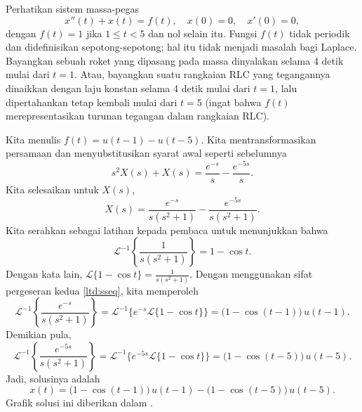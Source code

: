 \begin{example} \label{lt:rocketex}
Perhatikan
sistem massa-pegas
\begin{equation*}
x''(t) + x(t) = f(t) , \quad x(0) = 0, \quad x'(0) = 0,
\end{equation*}
dengan $f(t) = 1$ jika $1 \leq t < 5$ dan nol selain itu.
Fungsi $f(t)$ tidak periodik dan didefinisikan sepotong-sepotong; hal itu tidak menjadi masalah bagi Laplace.
Bayangkan sebuah
roket yang dipasang pada massa dinyalakan selama 4 detik mulai dari
$t=1$.  Atau, bayangkan suatu rangkaian RLC yang tegangannya dinaikkan
dengan laju konstan selama 4 detik mulai dari $t=1$, lalu dipertahankan tetap 
kembali
mulai dari $t=5$ (ingat bahwa $f(t)$ merepresentasikan turunan
tegangan dalam rangkaian RLC).

\pagebreak[2]
Kita menulis $f(t) = u(t-1) - u(t-5)$.  Kita mentransformasikan persamaan dan menyubstitusikan
syarat awal seperti sebelumnya
\begin{equation*}
s^2 X(s) + X(s) = \frac{e^{-s}}{s} - \frac{e^{-5s}}{s} .
\end{equation*}
Kita selesaikan untuk $X(s)$,
\begin{equation*}
X(s) = \frac{e^{-s}}{s(s^2+1)} - \frac{e^{-5s}}{s(s^2+1)} .
\end{equation*}
Kita serahkan sebagai latihan kepada pembaca untuk menunjukkan bahwa
\begin{equation*}
{\mathcal{L}}^{-1} \left\{ \frac{1}{s(s^2+1)} \right\}
= 1 - \cos t .
\end{equation*}
Dengan kata lain,
$\mathcal{L} \{ 1 - \cos t  \} = 
\frac{1}{s(s^2+1)}$.
Dengan menggunakan sifat pergeseran kedua \eqref{ltd:sseq}, kita memperoleh
\begin{equation*}
{\mathcal{L}}^{-1} \left\{ \frac{e^{-s}}{s(s^2+1)} \right\}
=
{\mathcal{L}}^{-1} \bigl\{
e^{-s}
\mathcal{L} \{ 1 - \cos t \}
\bigr\}
=
\bigl( 1 - \cos (t-1) \bigr) \, u(t-1) .
\end{equation*}
Demikian pula,
\begin{equation*}
{\mathcal{L}}^{-1} \left\{ \frac{e^{-5s}}{s(s^2+1)} \right\}
=
{\mathcal{L}}^{-1} \bigl\{
e^{-5s}
\mathcal{L} \{ 1 - \cos t \}
\bigr\}
=
\bigl( 1 - \cos (t-5) \bigr) \, u(t-5) .
\end{equation*}
Jadi, solusinya adalah
\begin{equation*}
x(t) = 
\bigl( 1 - \cos (t-1) \bigr) \, u(t-1) -
\bigl( 1 - \cos (t-5) \bigr) \, u(t-5) .
\end{equation*}
Grafik solusi ini diberikan dalam .

\begin{myfig}
\capstart
{}
\caption{Grafik $x(t)$.\label{lt:heavisideexfig}}
\end{myfig}
\end{example}

